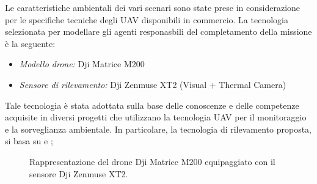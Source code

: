 Le caratteristiche ambientali dei vari scenari sono state prese in considerazione per le specifiche tecniche degli UAV disponibili in commercio. 
La tecnologia selezionata per modellare gli agenti responasbili del completamento della missione è la seguente:
\begin{itemize}
    \item \textit{Modello drone:} Dji Matrice M200
    \item \textit{Sensore di rilevamento:} Dji Zenmuse XT2 (Visual + Thermal Camera) 
\end{itemize}
Tale tecnologia è stata adottata sulla base delle conoscenze e delle competenze acquisite in diversi progetti che utilizzano la tecnologia UAV per il monitoraggio e la sorveglianza ambientale. 
In particolare, la tecnologia di rilevamento proposta, si basa su \cite{persechino2010aerospace} e \cite{lega2012using};

\begin{figure}[H] 
    \captionsetup{justification=centering, margin=2cm, font=footnotesize}
    \begin{center}
    \end{center}
    \caption{Rappresentazione del drone Dji Matrice M200 equipaggiato con il sensore Dji Zenmuse XT2.}
    \label{dji_matrice}
\end{figure}

